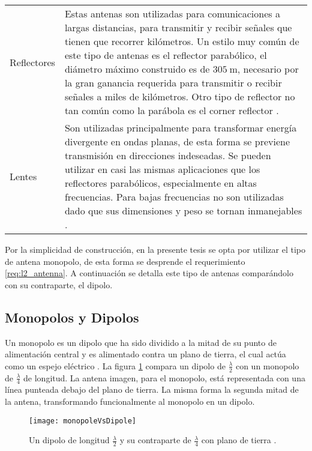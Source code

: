 \begin{table}[H]
\begin{tabular}{p{1.9cm} p{12.5cm}}
  Reflectores & Estas antenas son utilizadas para comunicaciones a largas distancias, para transmitir y recibir señales que tienen que recorrer kilómetros. Un estilo muy común de este tipo de antenas es el reflector parabólico, el diámetro máximo construido es de $\SI{305}{\meter}$, necesario por la gran ganancia requerida para transmitir o recibir señales a miles de kilómetros. Otro tipo de reflector no tan común como la parábola es el corner reflector \cite{Balanis2012}. \tabularnewline

  Lentes & Son utilizadas principalmente para transformar energía divergente en ondas planas, de esta forma se previene  transmisión en direcciones indeseadas. Se pueden utilizar en casi las mismas aplicaciones que los reflectores parabólicos, especialmente en altas frecuencias. Para bajas frecuencias no son utilizadas dado que sus dimensiones y peso se tornan inmanejables \cite{Balanis2012}. \tabularnewline
  \bottomrule 
  \end{tabular}
  \label{tab:type_antennas}
\end{table}

Por la simplicidad de construcción, en la presente tesis se opta por utilizar el tipo de antena monopolo, de esta forma se desprende el requerimiento \ref{req:l2_antenna}. A continuación se detalla este tipo de antenas comparándolo con su contraparte, el dipolo.


\subsection{Monopolos y Dipolos}

Un monopolo es un dipolo que ha sido dividido a la mitad de su punto de alimentación central y es alimentado contra un plano de tierra, el cual actúa como un espejo eléctrico \cite{arrl2007}. La figura \ref{fig:monopoles} compara un dipolo de $\frac{\lambda}{2}$ con un monopolo de $\frac{\lambda}{4}$ de longitud. La antena imagen, para el monopolo, está representada con una línea punteada debajo del plano de tierra. La misma forma la segunda mitad de la antena, transformando funcionalmente al monopolo en un dipolo.

\begin{figure}
 \centering
 \texttt{[image: monopoleVsDipole]}
 \caption{Un dipolo de longitud $\frac{\lambda}{2}$ y su contraparte de $\frac{\lambda}{4}$ con plano de tierra \cite{arrl2007}.}
 \label{fig:monopoles}
\end{figure}

